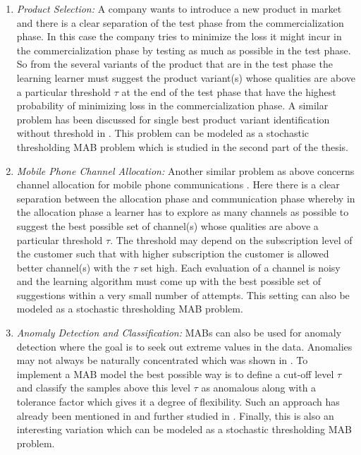 \begin{enumerate}
\item \emph{Product Selection:} A company wants to introduce a new product in market and there is a clear separation of the test phase from the commercialization phase. In this case the company tries to minimize the loss it might incur in the commercialization phase by testing as much as possible in the test phase. So from the several variants of the product that are in the test phase the learning learner must suggest the product variant(s) whose qualities are above a particular threshold $\tau$ at the end of the test phase that have the highest probability of minimizing loss in the commercialization phase. A similar problem has been discussed for single best product variant identification without threshold in \citet{bubeck2011pure}. This problem can be modeled as a stochastic thresholding MAB problem which is studied in the second part of the thesis.
\item \emph{Mobile Phone Channel Allocation:} Another similar problem as above concerns channel allocation for mobile phone communications \citep{audibert2009exploration}. Here there is a clear separation between the allocation phase and communication phase whereby in the allocation phase a learner has to explore as many channels as possible to suggest the best possible set of channel(s) whose qualities are above a particular threshold $\tau$. The threshold may depend on the subscription level of the customer such that with higher subscription the customer is allowed better channel(s) with the $\tau$ set high. Each evaluation of a channel is noisy and the learning algorithm must come up with the best possible set of suggestions within a very small  number of attempts. This setting can also be modeled as a stochastic thresholding MAB problem.
\item \emph{Anomaly Detection and Classification:} MABs can also be used for anomaly detection where the goal is to seek out extreme values in the data. Anomalies may not always be naturally concentrated which was shown in  \citet{steinwart2005classification}. To implement a MAB model the best possible way is to define a cut-off level $\tau$ and classify the samples above this level $\tau$ as anomalous along with a tolerance factor which gives it a degree of flexibility. Such an approach has already been mentioned in \citet{streeter2006selecting} and further studied in \citet{locatelli2016optimal}. Finally, this is also an interesting variation which can be modeled as a stochastic thresholding MAB problem.
\end{enumerate}



